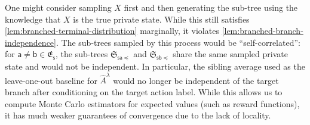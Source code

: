 \documentclass[12pt, a4paper]{article}
\begin{document}
\begin{warning}\label{warn:no-private-tilting}
    One might consider sampling $X$ first and then generating the sub-tree using the knowledge that $X$ is the true private state.
    While this still satisfies \autoref{lem:branched-terminal-distribution} marginally, it violates \autoref{lem:branched-branch-independence}.
    The sub-trees sampled by this process would be ``self-correlated'': for $\mathsf{a}\neq\mathsf{b}\in \mathfrak{E}_{\mathsf{s}}$, the sub-trees $\mathfrak{S}_{\mathsf{s}\mathsf{a} \preccurlyeq}$ and $\mathfrak{S}_{\mathsf{s}\mathsf{b} \preccurlyeq}$ share the same sampled private state and would not be independent.
    In particular, the sibling average used as the leave-one-out baseline for $\widehat{A}^\lambda$ would no longer be independent of the target branch after conditioning on the target action label.
    While this allows us to compute Monte Carlo estimators for expected values (such as reward functions), it has much weaker guarantees of convergence due to the lack of locality.
\end{warning}
\end{document}

